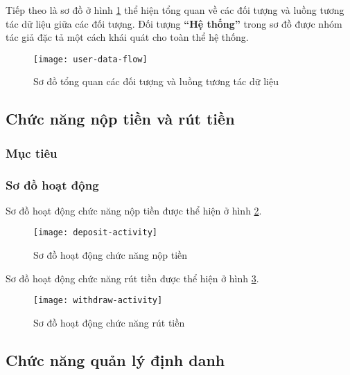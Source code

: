 \documentclass[../main-report.tex]{subfiles}
\begin{document}
Tiếp theo là sơ đồ ở hình \ref{fig:user-data-flow} thể hiện tổng quan về các đối tượng và luồng tương tác dữ liệu giữa các đối tượng. Đối tượng \textbf{``Hệ thống''} trong sơ đồ được nhóm tác giả đặc tả một cách khái quát cho toàn thể hệ thống.

\begin{figure}[ht!]
\begin{center}
\label{fig:user-data-flow}
\texttt{[image: user-data-flow]}
\caption{Sơ đồ tổng quan các đối tượng và luồng tương tác dữ liệu}
\end{center}
\end{figure}

\subsection{Chức năng nộp tiền và rút tiền}
\subsubsection{Mục tiêu}

\subsubsection{Sơ đồ hoạt động}
Sơ đồ hoạt động chức năng nộp tiền được thể hiện ở hình \ref{fig:deposit-activity}.

\begin{figure}[ht!]
\begin{center}
\label{fig:deposit-activity}
\texttt{[image: deposit-activity]}
\caption{Sơ đồ hoạt động chức năng nộp tiền}
\end{center}
\end{figure}

Sơ đồ hoạt động chức năng rút tiền được thể hiện ở hình \ref{fig:withdraw-activity}.

\begin{figure}[ht!]
\begin{center}
\label{fig:withdraw-activity}
\texttt{[image: withdraw-activity]}
\caption{Sơ đồ hoạt động chức năng rút tiền}
\end{center}
\end{figure}

\subsection{Chức năng quản lý định danh}
\end{document}
